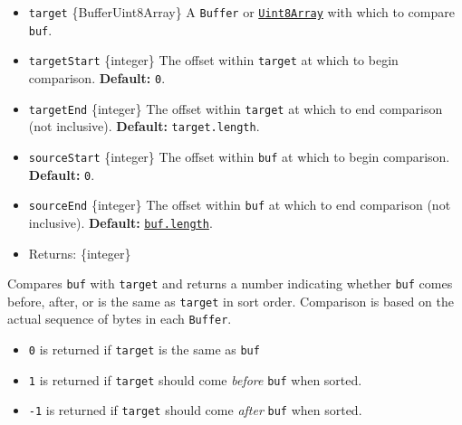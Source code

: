 \begin{itemize}
\tightlist
\item
  \texttt{target} \{Buffer\textbar Uint8Array\} A \texttt{Buffer} or
  \href{https://developer.mozilla.org/en-US/docs/Web/JavaScript/Reference/Global_Objects/Uint8Array}{\texttt{Uint8Array}}
  with which to compare \texttt{buf}.
\item
  \texttt{targetStart} \{integer\} The offset within \texttt{target} at
  which to begin comparison. \textbf{Default:} \texttt{0}.
\item
  \texttt{targetEnd} \{integer\} The offset within \texttt{target} at
  which to end comparison (not inclusive). \textbf{Default:}
  \texttt{target.length}.
\item
  \texttt{sourceStart} \{integer\} The offset within \texttt{buf} at
  which to begin comparison. \textbf{Default:} \texttt{0}.
\item
  \texttt{sourceEnd} \{integer\} The offset within \texttt{buf} at which
  to end comparison (not inclusive). \textbf{Default:}
  \hyperref[buflength]{\texttt{buf.length}}.
\item
  Returns: \{integer\}
\end{itemize}

Compares \texttt{buf} with \texttt{target} and returns a number
indicating whether \texttt{buf} comes before, after, or is the same as
\texttt{target} in sort order. Comparison is based on the actual
sequence of bytes in each \texttt{Buffer}.

\begin{itemize}
\tightlist
\item
  \texttt{0} is returned if \texttt{target} is the same as \texttt{buf}
\item
  \texttt{1} is returned if \texttt{target} should come \emph{before}
  \texttt{buf} when sorted.
\item
  \texttt{-1} is returned if \texttt{target} should come \emph{after}
  \texttt{buf} when sorted.
\end{itemize}

